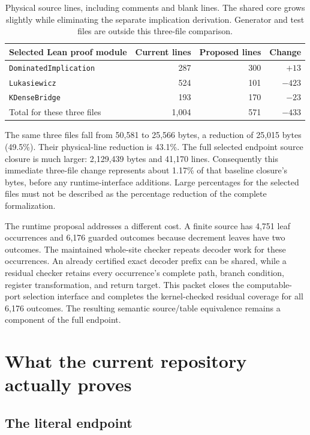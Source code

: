 \documentclass[11pt,letterpaper]{article}
\newcommand{\code}[1]{\texttt{#1}}
\begin{document}
\begin{table}[ht]
\centering\small
\begin{tabular}{lrrr}
\toprule
Selected Lean proof module & Current lines & Proposed lines & Change\\
\midrule
\code{DominatedImplication} & 287 & 300 & $+13$\\
\code{Lukasiewicz} & 524 & 101 & $-423$\\
\code{KDenseBridge} & 193 & 170 & $-23$\\
\midrule
Total for these three files & 1,004 & 571 & $-433$\\
\bottomrule
\end{tabular}
\caption{Physical source lines, including comments and blank lines. The shared core
grows slightly while eliminating the separate implication derivation. Generator and
test files are outside this three-file comparison.}
\end{table}

The same three files fall from 50,581 to 25,566 bytes, a reduction of 25,015 bytes
(49.5\%). Their physical-line reduction is 43.1\%. The full selected endpoint source
closure is much larger: 2,129,439 bytes and 41,170 lines. Consequently this immediate
three-file change represents about 1.17\% of that baseline closure's bytes, before any
runtime-interface additions. Large percentages for the selected files must not be
described as the percentage reduction of the complete formalization.

The runtime proposal addresses a different cost. A finite source has 4,751 leaf
occurrences and 6,176 guarded outcomes because decrement leaves have two outcomes.
The maintained whole-site checker repeats decoder work for these occurrences. An
already certified exact decoder prefix can be shared, while a residual checker retains
every occurrence's complete path, branch condition, register transformation, and return
target. This packet closes the computable-port selection interface and completes the
kernel-checked residual coverage for all 6,176 outcomes. The resulting semantic
source/table equivalence remains a component of the full endpoint.



\section{What the current repository actually proves}

\subsection{The literal endpoint}
\end{document}
